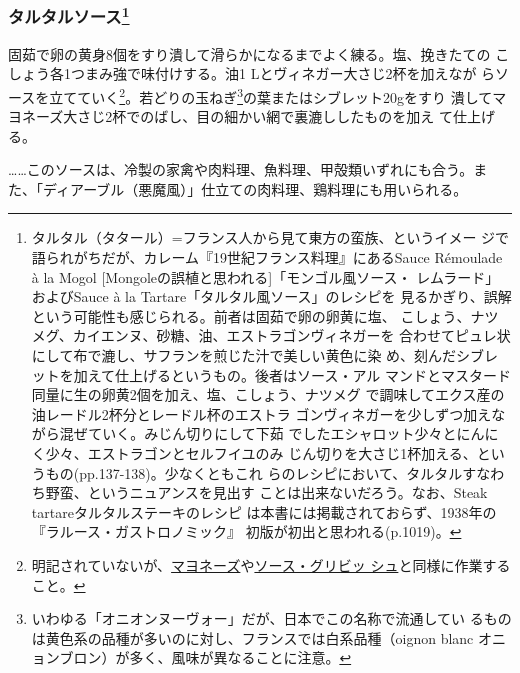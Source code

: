 \begin{recette}
{\subsubsection[タルタルソース]{\texorpdfstring{タルタルソース\footnote{タルタル（タタール）=フランス人から見て東方の蛮族、というイメー
  ジで語られがちだが、カレーム『19世紀フランス料理』にあるSauce
  Rémoulade à la Mogol {[}Mongoleの誤植と思われる{]}「モンゴル風ソース・
  レムラード」およびSauce à la Tartare「タルタル風ソース」のレシピを
  見るかぎり、誤解という可能性も感じられる。前者は固茹で卵の卵黄に塩、
  こしょう、ナツメグ、カイエンヌ、砂糖、油、エストラゴンヴィネガーを
  合わせてピュレ状にして布で漉し、サフランを煎じた汁で美しい黄色に染
  め、刻んだシブレットを加えて仕上げるというもの。後者はソース・アル
  マンドとマスタード同量に生の卵黄2個を加え、塩、こしょう、ナツメグ
  で調味してエクス産の油レードル2杯分とレードル\undemi{}杯のエストラ
  ゴンヴィネガーを少しずつ加えながら混ぜていく。みじん切りにして下茹
  でしたエシャロット少々とにんにく少々、エストラゴンとセルフイユのみ
  じん切りを大さじ1杯加える、というもの(pp.137-138)。少なくともこれ
  らのレシピにおいて、タルタルすなわち野蛮、というニュアンスを見出す
  ことは出来ないだろう。なお、Steak tartareタルタルステーキのレシピ
  は本書には掲載されておらず、1938年の『ラルース・ガストロノミック』
  初版が初出と思われる(p.1019)。}}{タルタルソース}}\label{sauce-tartare}}



固茹で卵の黄身8個をすり潰して滑らかになるまでよく練る。塩、挽きたての
こしょう各1つまみ強で味付けする。油1 Lとヴィネガー大さじ2杯を加えなが
らソースを立てていく\footnote{明記されていないが、\protect\hyperlink{mayonnaise}{マヨネーズ}や\protect\hyperlink{sauce-gribiche}{ソース・グリビッ
  シュ}と同様に作業すること。}。若どりの玉ねぎ\footnote{いわゆる「オニオンヌーヴォー」だが、日本でこの名称で流通してい
  るものは黄色系の品種が多いのに対し、フランスでは白系品種（oignon blanc
  オニョンブロン）が多く、風味が異なることに注意。}の葉またはシブレット20gをすり
潰してマヨネーズ大さじ2杯でのばし、目の細かい網で裏漉ししたものを加え
て仕上げる。

\ldots{}\ldots{}このソースは、冷製の家禽や肉料理、魚料理、甲殻類いずれにも合う。ま
た、「ディアーブル（悪魔風）」仕立ての肉料理、鶏料理にも用いられる。


\end{recette}
